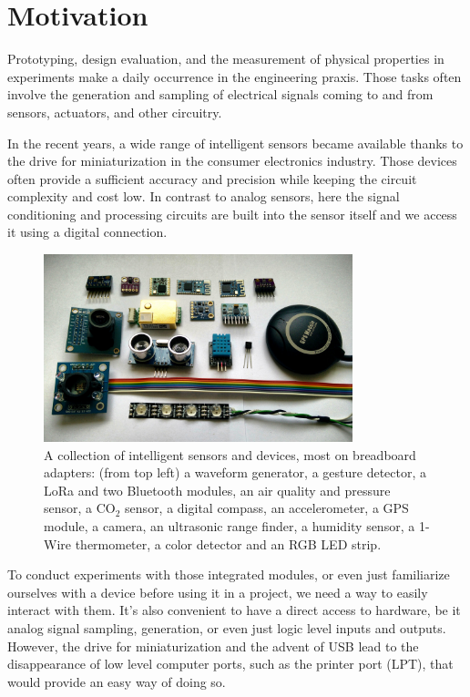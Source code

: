 \chapter{Motivation}

Prototyping, design evaluation, and the measurement of physical properties in experiments make a daily occurrence in the engineering praxis. Those tasks often involve the generation and sampling of electrical signals coming to and from sensors, actuators, and other circuitry. 

In the recent years, a wide range of intelligent sensors became available thanks to the drive for miniaturization in the consumer electronics industry. Those devices often provide a sufficient accuracy and precision while keeping the circuit complexity and cost low. In contrast to analog sensors, here the signal conditioning and processing circuits are built into the sensor itself and we access it using a digital connection.

\begin{figure}[H]
	\centering
	\includegraphics[width=0.8\textwidth] {img/inteligent-sensors.jpg}
	\caption[A collection of intelligent sensors and devices]{A collection of intelligent sensors and devices, most on breadboard adapters: (from top left) a waveform generator, a gesture detector, a LoRa and two Bluetooth modules, an air quality and pressure sensor, a CO$_2$ sensor, a digital compass, an accelerometer, a GPS module, a camera, an ultrasonic range finder, a humidity sensor, a 1-Wire thermometer, a color detector and an RGB LED strip.}
\end{figure}

To conduct experiments with those integrated modules, or even just familiarize ourselves with a device before using it in a project, we need a way to easily interact with them. It's also convenient to have a direct access to hardware, be it analog signal sampling, generation, or even just logic level inputs and outputs. However, the drive for miniaturization and the advent of \gls{USB} lead to the disappearance of low level computer ports, such as the printer port (LPT), that would provide an easy way of doing so.

